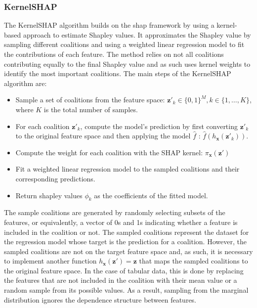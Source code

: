 \subsubsection{KernelSHAP} \label{sec:kernelshap}

The KernelSHAP algorithm builds on the \acrshort{shap} framework by using a kernel-based approach to estimate Shapley values. It approximates the Shapley value by sampling different coalitions and using a weighted linear regression model to fit the contributions of each feature. The method relies on not all coalitions contributing equally to the final Shapley value and as such uses kernel weights to identify the most important coalitions. The main steps of the KernelSHAP algorithm are:
\begin{itemize}
    \item Sample a set of coalitions from the feature space: $\mathbf{z}'_k \in \{0,1\}^M, k \in \{1, \ldots, K\}$, where $K$ is the total number of samples.
    \item For each coalition $\mathbf{z}'_k$, compute the model's prediction by first converting $\mathbf{z}'_k$ to the original feature space and then applying the model $\hat{f}$ : $\hat{f}\left(h_\mathbf{x}\left(\mathbf{z}'_k\right)\right)$.
    \item Compute the weight for each coalition with the SHAP kernel: $\pi_\mathbf{x} (\mathbf{z}')$ 
    \item Fit a weighted linear regression model to the sampled coalitions and their corresponding predictions.
    \item Return shapley values $\phi_k$ as the coefficients of the fitted model.
\end{itemize}

The sample coalitions are generated by randomly selecting subsets of the features, or equivalently, a vector of 0s and 1s indicating whether a feature is included in the coalition or not. The sampled coalitions represent the dataset for the regression model whose target is the prediction for a coalition. However, the sampled coalitions are not on the target feature space and, as such, it is necessary to implement another function $h_{\mathbf{x}}\left(\mathbf{z}'\right) = \mathbf{z}$ that maps the sampled coalitions to the original feature space. In the case of tabular data, this is done by replacing the features that are not included in the coalition with their mean value or a random sample from its possible values. As a result, sampling from the marginal distribution ignores the dependence structure between features.

